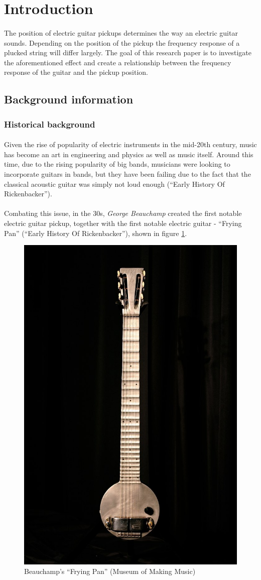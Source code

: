 \documentclass{article}
\begin{document}
\section{Introduction}

\paragraph*{}
The position of electric guitar pickups determines the way an electric guitar
sounds. Depending on the position of the pickup the frequency response of a
plucked string will differ largely. The goal of this research paper is to
investigate the aforementioned effect and create a relationship between the
frequency response of the guitar and the pickup position.

\subsection{Background information}

\subsubsection{Historical background}

\paragraph*{}
Given the rise of popularity of electric instruments in the mid-20th century, 
music has become an art in engineering and physics as well as music itself.
Around this time, due to the rising popularity of big bands, musicians were
looking to incorporate guitars in bands, but they have been failing due to the
fact that the classical acoustic guitar was simply not loud enough (``Early 
History Of Rickenbacker'').

\paragraph*{}
Combating this issue, in the 30s, \textit{George Beauchamp} created the first
notable electric guitar pickup, together with the first notable electric guitar
- ``Frying Pan'' (``Early History Of Rickenbacker''), shown in figure
\ref{fig:frying-pan}.
\begin{figure}[ht]
	\centering
	\includegraphics[width=.4\linewidth]{img/frying-pan}
	\caption{Beauchamp's ``Frying Pan'' (Museum of Making Music)}
	\label{fig:frying-pan}
\end{figure}
\end{document}
